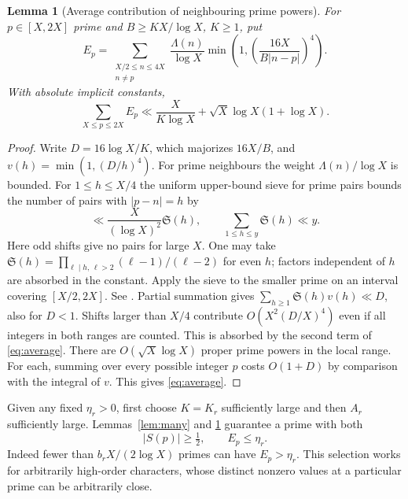\documentclass[11pt]{article}
\newtheorem{lemma}[theorem]{Lemma}
\begin{document}
\begin{lemma}[Average contribution of neighbouring prime powers]\label{lem:sieve}
For \(p\in[X,2X]\) prime and \(B\ge KX/\log X\), \(K\ge1\), put
\[
 E_p=\sum_{\substack{X/2\le n\le4X\\n\ne p}}
 \frac{\Lambda(n)}{\log X}\min\left(1,\left(\frac{16X}{B|n-p|}\right)^4\right).
\]
With absolute implicit constants,
\begin{equation}\label{eq:average}
 \sum_{X\le p\le2X} E_p
 \ll \frac{X}{K\log X}+\sqrt X\log X(1+\log X).
\end{equation}
\end{lemma}
\begin{proof}
Write \(D=16\log X/K\), which majorizes \(16X/B\), and \(v(h)=\min(1,(D/h)^4)\). For prime neighbours the weight \(\Lambda(n)/\log X\) is bounded. For \(1\le h\le X/4\) the uniform upper-bound sieve for prime pairs bounds the number of pairs with \(|p-n|=h\) by
\[
 \ll \frac{X}{(\log X)^2}\mathfrak S(h),\qquad
 \sum_{1\le h\le y}\mathfrak S(h)\ll y.
\]
Here odd shifts give no pairs for large \(X\). One may take \(\mathfrak S(h)=\prod_{\ell\mid h,\,\ell>2}(\ell-1)/(\ell-2)\) for even \(h\); factors independent of \(h\) are absorbed in the constant. Apply the sieve to the smaller prime on an interval covering \([X/2,2X]\). See \cite[Lemma 2.1]{evans}. Partial summation gives \(\sum_{h\ge1}\mathfrak S(h)v(h)\ll D\), also for \(D<1\). Shifts larger than \(X/4\) contribute \(O(X^2(D/X)^4)\) even if all integers in both ranges are counted. This is absorbed by the second term of \eqref{eq:average}. There are \(O(\sqrt X\log X)\) proper prime powers in the local range. For each, summing over every possible integer \(p\) costs \(O(1+D)\) by comparison with the integral of \(v\). This gives \eqref{eq:average}.
\end{proof}

Given any fixed \(\eta_r>0\), first choose \(K=K_r\) sufficiently large and then \(A_r\) sufficiently large. Lemmas~\ref{lem:many} and \ref{lem:sieve} guarantee a prime with both
\begin{equation}\label{eq:witness}
 |S(p)|\ge\tfrac12,\qquad E_p\le\eta_r.
\end{equation}
Indeed fewer than \(b_r X/(2\log X)\) primes can have \(E_p>\eta_r\). This selection works for arbitrarily high-order characters, whose distinct nonzero values at a particular prime can be arbitrarily close.
\end{document}
